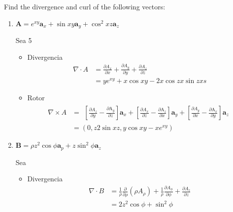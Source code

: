 \begin{problema}
    Find the divergence and curl of the following vectors:
    \begin{enumerate}
        \item $\mathbf{A}=e^{x y} \mathbf{a}_{x}+\sin x y \mathbf{a}_{y}+\cos ^{2} x z \mathbf{a}_{z}$
        \begin{sol}
            Sea  5
            \begin{itemize}
                \item Divergencia
                \begin{align*}
                    \nabla\cdot A &= \frac{\partial A_x}{\partial x}+\frac{\partial A_y}{\partial y}+\frac{\partial A_z}{\partial z}\\
                    &= ye^{xy}+x\cos xy-2x\cos zx\sin zxs
                \end{align*}
                \item Rotor
                \begin{align*}
                    \nabla\times A &= \begin{aligned}
                        {\left[\frac{\partial A_z}{\partial y}-\frac{\partial \mathrm{A}_y}{\partial z}\right] \mathbf{a}_x+\left[\frac{\partial A_x}{\partial z}-\frac{\partial \mathrm{A}_z}{\partial x}\right] \mathbf{a}_y}
                        +\left[\frac{\partial A_y}{\partial x}-\frac{\partial \mathrm{A}_x}{\partial y}\right] \mathbf{a}_z
                        \end{aligned}\\
                        &= (0,z2\sin xz,y\cos xy-xe^{xy})
                \end{align*}
            \end{itemize}
        \end{sol}
        \item $\mathbf{B}=\rho z^{2} \cos \phi \mathbf{a}_{p}+z \sin ^{2} \phi \mathbf{a}_{z}$
        \begin{sol}
            Sea 
            \begin{itemize}
                \item Divergencia
                \begin{align*}
                    \nabla\cdot B &= \frac{1}{\rho} \frac{\partial}{\partial \rho}\left(\rho A_\rho\right)+\frac{1}{\rho} \frac{\partial A_\phi}{\partial \phi}+\frac{\partial A_z}{\partial z}\\
                    &=2z^2\cos\phi +\sin^2\phi
                \end{align*}

\end{itemize}
\end{sol}
\end{enumerate}
\end{problema}
